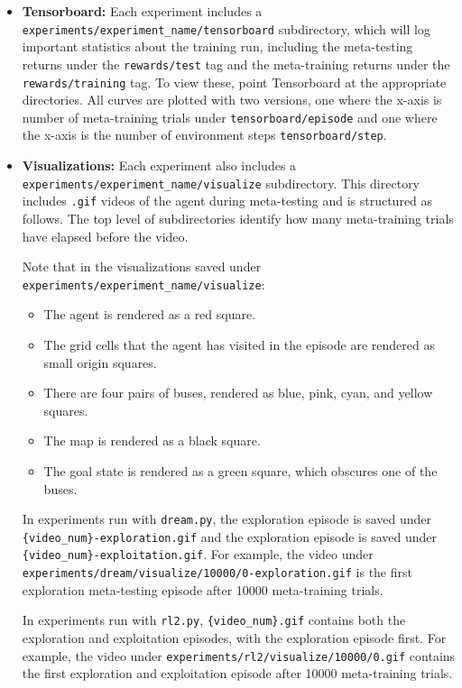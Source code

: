 \begin{itemize}
    \item \textbf{Tensorboard:} Each experiment includes a \texttt{experiments/experiment\_name/tensorboard} subdirectory, which will log important statistics about the training run, including the meta-testing returns under the \texttt{rewards/test} tag and the meta-training returns under the \texttt{rewards/training} tag. To view these, point Tensorboard at the appropriate directories. All curves are plotted with two versions, one where the x-axis is number of meta-training trials under \texttt{tensorboard/episode} and one where the x-axis is the number of environment steps \texttt{tensorboard/step}.
    
    \item \textbf{Visualizations:} Each experiment also includes a \texttt{experiments/experiment\_name/visualize} subdirectory. This directory includes \texttt{.gif} videos of the agent during meta-testing and is structured as follows. The top level of subdirectories identify how many meta-training trials have elapsed before the video.

    Note that in the visualizations saved under \texttt{experiments/experiment\_name/visualize}:

    \begin{itemize}
        \item The agent is rendered as a red square.
        
        \item The grid cells that the agent has visited in the episode are rendered as small origin squares.
        
        \item There are four pairs of buses, rendered as blue, pink, cyan, and yellow squares.
        
        \item The map is rendered as a black square.
        
        \item The goal state is rendered as a green square, which obscures one of the buses.
    \end{itemize}

    
    In experiments run with \texttt{dream.py}, the exploration episode is saved under \texttt{\{video\_num\}-exploration.gif} and the exploration episode is saved under \texttt{\{video\_num\}-exploitation.gif}. For example, the video under \texttt{experiments/dream/visualize/10000/0-exploration.gif} is the first exploration meta-testing episode after 10000 meta-training trials.
    
    In experiments run with \texttt{rl2.py}, \texttt{\{video\_num\}.gif} contains both the exploration and exploitation episodes, with the exploration episode first. For example, the video under \texttt{experiments/rl2/visualize/10000/0.gif} contains the first exploration and exploitation episode after 10000 meta-training trials.
\end{itemize}

